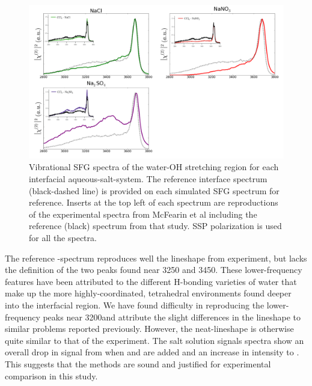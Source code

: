 \begin{figure}[h!]
\begin{center}
	\includegraphics[scale=1.0]{images/sfg-spectra.png}
	\caption{Vibrational SFG spectra of the water-OH stretching region for each interfacial aqueous-salt-\ctc system. The reference \ctcwat interface spectrum (black-dashed line) is provided on each simulated SFG spectrum for reference. Inserts at the top left of each spectrum are reproductions of the experimental spectra from McFearin et al\cite{McFearin2009} including the reference (black) spectrum from that study. SSP polarization is used for all the spectra.}
	\label{fig:sfg-spectra}
\end{center}
\end{figure}

The reference \ctc-\wat spectrum reproduces well the lineshape from experiment, but lacks the definition of the two peaks found near 3250 and 3450\cm. These lower-frequency features have been attributed to the different H-bonding varieties of water that make up the more highly-coordinated, tetrahedral environments found deeper into the interfacial region. We have found difficulty in reproducing the lower-frequency peaks near 3200\cm and attribute the slight differences in the lineshape to similar problems reported previously.\cite{Walker2006b} However, the neat-\ctcwat lineshape is otherwise quite similar to that of the experiment. The salt solution signals spectra show an overall drop in signal from when \cl and \nit are added and an increase in intensity to \sul. This suggests that the methods are sound and justified for experimental comparison in this study.


